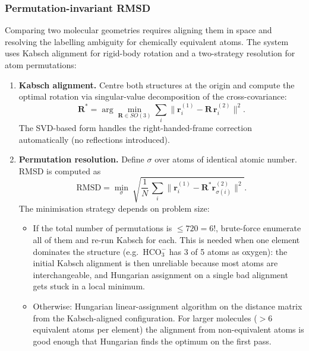 \subsubsection{Permutation-invariant RMSD}
\label{sec:shared-rmsd}

Comparing two molecular geometries requires aligning them in space and resolving the labelling ambiguity for chemically equivalent atoms. The system uses Kabsch alignment for rigid-body rotation and a two-strategy resolution for atom permutations:

\begin{enumerate}
    \item \textbf{Kabsch alignment.} Centre both structures at the origin and compute the optimal rotation via singular-value decomposition of the cross-covariance:
    \begin{equation}
        \mathbf{R}^* = \arg\min_{\mathbf{R} \in SO(3)} \sum_i \lVert \mathbf{r}_i^{(1)} - \mathbf{R}\,\mathbf{r}_i^{(2)} \rVert^2.
    \end{equation}
    The SVD-based form handles the right-handed-frame correction automatically (no reflections introduced).

    \item \textbf{Permutation resolution.} Define $\sigma$ over atoms of identical atomic number. RMSD is computed as
    \begin{equation}
        \text{RMSD} = \min_{\sigma}\ \sqrt{\frac{1}{N}\,\sum_i \lVert \mathbf{r}_i^{(1)} - \mathbf{R}^* \mathbf{r}_{\sigma(i)}^{(2)} \rVert^2}.
    \end{equation}
    The minimisation strategy depends on problem size:
    \begin{itemize}
        \item If the total number of permutations is $\leq 720 = 6!$, brute-force enumerate all of them and re-run Kabsch for each. This is needed when one element dominates the structure (e.g.\ $\mathrm{HCO_3^-}$ has 3 of 5 atoms as oxygen): the initial Kabsch alignment is then unreliable because most atoms are interchangeable, and Hungarian assignment on a single bad alignment gets stuck in a local minimum.
        \item Otherwise: Hungarian linear-assignment algorithm on the distance matrix from the Kabsch-aligned configuration. For larger molecules ($> 6$ equivalent atoms per element) the alignment from non-equivalent atoms is good enough that Hungarian finds the optimum on the first pass.
    \end{itemize}
\end{enumerate}

